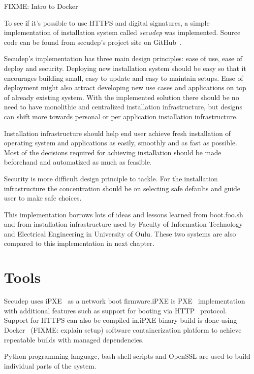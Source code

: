 
FIXME: Intro to Docker

To see if it's possible to use HTTPS and digital signatures, a simple
implementation of installation system called \emph{secudep} was
implemented. Source code can be found from secudep's project site on
GitHub~\cite{secudep}.

Secudep's implementation has three main design principles: ease of
use, ease of deploy and security. Deploying new installation system
should be easy so that it encourages building small, easy to update
and easy to maintain setups. Ease of deployment might also attract
developing new use cases and applications on top of already existing
system. With the implemented solution there should be no need to have
monolithic and centralized installation infrastructure, but designs
can shift more towards personal or per application installation
infrastructure.

Installation infrastructure should help end user achieve fresh
installation of operating system and applications as easily, smoothly
and as fast as possible. Most of the decisions required for achieving
installation should be made beforehand and automatized as much as
feasible.

Security is more difficult design principle to tackle. For the
installation infrastructure the concentration should be on selecting
safe defaults and guide user to make safe choices.

This implementation borrows lots of ideas and lessons learned from
boot.foo.sh\cite{boot-foo-sh} and from installation infrastructure
used by Faculty of Information Technology and Electrical Engineering
in University of Oulu. These two systems are also compared to this
implementation in next chapter.

\section{Tools}

Secudep uses iPXE~\cite{iPXE} as a network boot firmware.\@ iPXE is
PXE~\cite{PXEspec} implementation with additional features such as
support for booting via HTTP~\cite{RFC2616} protocol. Support for
HTTPS can also be compiled in.\@ iPXE binary build is done using
Docker~\cite{Docker} (FIXME: explain setup) software containerization
platform to achieve repeatable builds with managed dependencies.

Python programming language, bash shell scripts and OpenSSL are used
to build individual parts of the system.

